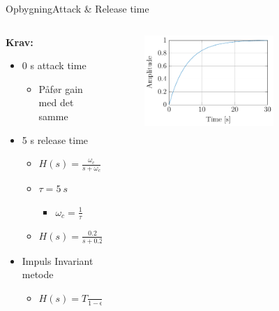 \begin{frame}{Opbygning}{Attack \& Release time}
\begin{columns}
  \begin{column}{0.4\textwidth}
\textbf{Krav:}

\begin{itemize}
\item 0 s attack time
\begin{itemize}
\item Påfør gain med det samme
\end{itemize}
\item 5 s release time
\begin{itemize}
\item $H(s) = \frac{\omega_c}{s+\omega_c}$
\item $\tau = 5 \ s$
\begin{itemize}
\item $\omega_c=\frac{1}{\tau}$
\end{itemize}
\item $H(s) = \frac{0.2}{s+0.2}$
\end{itemize}
\item Impuls Invariant metode
\begin{itemize}
\item $H(s) = T\frac{0.2}{1-\text{e}^{-0.2T} z^{-1}}$
\end{itemize}
\end{itemize}

  \end{column}

  \begin{column}{0.6\textwidth}
\begin{figure}
\centering
\includegraphics[width=0.7\textwidth]{releaseTimeDigitalStep}
\end{figure}

  \end{column}
\end{columns}
\end{frame}





















